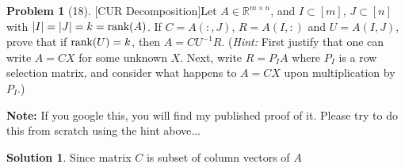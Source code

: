 \documentclass{amsart}[11pt]
\theoremstyle{definition}
\newtheorem*{problem}{Problem}
\newtheorem*{solution}{Solution}
\newcommand{\R}{\mathbb{R}}
\newcommand{\rank}{\textnormal{rank}}
\begin{document}
\begin{problem}[18][CUR Decomposition]\label{PROB:CUREasy}
Let $A\in\R^{m\times n}$, and $I\subset[m]$, $J\subset[n]$ with $|I|=|J|=k=\textnormal{rank}(A)$.  If $C=A(:,J)$, $R=A(I,:)$ and $U=A(I,J)$, prove that if $\rank(U)=k$, then $A=CU^{-1}R$.  (\textit{Hint:} First justify that one can write $A=CX$ for some unknown $X$. Next, write $R=P_IA$ where $P_I$ is a row selection matrix, and consider what happens to $A=CX$ upon multiplication by $P_I$.)

\textbf{Note:} If you google this, you will find my published proof of it. Please try to do this from scratch using the hint above... 
\begin{solution}
    Since matrix $C$ is subset of column vectors of $A$
\end{solution}
\end{problem}
\end{document}
